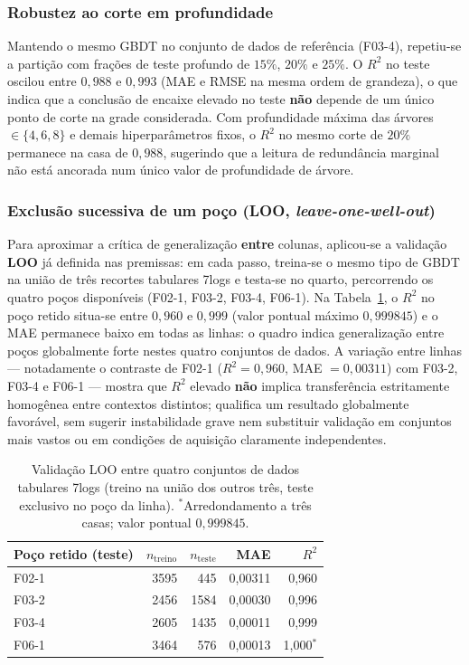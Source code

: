 \documentclass[12pt,a4paper]{article}
\newcommand{\dadosref}{conjunto de dados de referência (F03-4)}
\begin{document}
\subsubsection{Robustez ao corte em profundidade}
Mantendo o mesmo GBDT no \dadosref, repetiu-se a partição com frações de teste
profundo de \(15\%\), \(20\%\) e \(25\%\). O \(R^2\) no teste oscilou entre \(0{,}988\) e
\(0{,}993\) (MAE e RMSE na mesma ordem de grandeza), o que indica que a conclusão de
encaixe elevado no teste \textbf{não} depende de um único ponto de corte na grade considerada.
Com profundidade máxima das árvores \(\in \{4,6,8\}\) e demais hiperparâmetros fixos, o \(R^2\) no
mesmo corte de \(20\%\) permanece na casa de \(0{,}988\), sugerindo que a leitura de
redundância marginal não está ancorada num único valor de profundidade de árvore.

\subsubsection{Exclusão sucessiva de um poço (LOO, \textit{leave-one-well-out})}
Para aproximar a crítica de generalização \textbf{entre} colunas, aplicou-se a validação
\textbf{LOO} já definida nas premissas: em cada passo, treina-se o mesmo tipo de GBDT na união
de três recortes tabulares 7logs e testa-se no quarto, percorrendo os quatro
poços disponíveis (F02-1, F03-2, F03-4, F06-1). Na Tabela~\ref{tab:loo_well}, o \(R^2\) no
poço retido situa-se entre \(0{,}960\) e \(0{,}999\) (valor pontual máximo \(0{,}999845\))
e o MAE permanece baixo em todas as linhas: o quadro indica generalização entre poços
globalmente forte nestes quatro conjuntos de dados. A variação entre linhas ---
notadamente o contraste de F02-1 (\(R^2=0{,}960\), MAE \(=0{,}00311\)) com F03-2, F03-4 e
F06-1 --- mostra que \(R^2\) elevado \textbf{não} implica transferência estritamente homogênea
entre contextos distintos; qualifica um resultado globalmente favorável, sem sugerir
instabilidade grave nem substituir validação em conjuntos mais vastos ou em condições
de aquisição claramente independentes.

\begin{table}[h]
\centering
\small
\begin{tabular}{lrrrr}
\toprule
Poço retido (teste) & \(n_{\mathrm{treino}}\) & \(n_{\mathrm{teste}}\) & MAE & \(R^2\) \\
\midrule
F02-1 & 3595 & 445 & 0{,}00311 & 0{,}960 \\
F03-2 & 2456 & 1584 & 0{,}00030 & 0{,}996 \\
F03-4 & 2605 & 1435 & 0{,}00011 & 0{,}999 \\
F06-1 & 3464 & 576 & 0{,}00013 & 1{,}000$^\ast$ \\
\bottomrule
\end{tabular}
\caption{Validação LOO entre quatro conjuntos de dados tabulares 7logs (treino na união dos outros três,
teste exclusivo no poço da linha).
$^\ast$Arredondamento a três casas; valor pontual \(0{,}999845\).}
\label{tab:loo_well}
\end{table}
\end{document}
